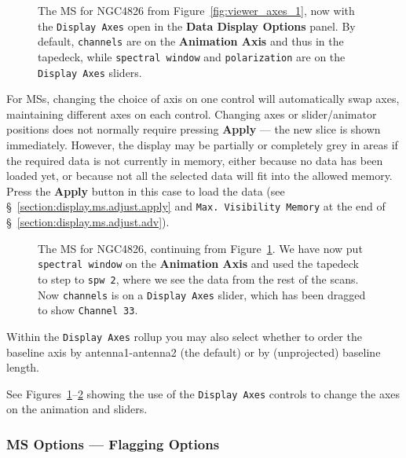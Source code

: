 \begin{figure}[h!]
\begin{center}
\caption{\label{fig:viewer_axes_2} 
The MS for NGC4826 from Figure~\ref{fig:viewer_axes_1}, now with the
{\tt Display Axes} open in the {\bf Data Display Options} panel.  By
default, {\tt channels} are on the {\bf Animation Axis} and thus in
the tapedeck, while {\tt spectral window} and {\tt polarization} are
on the {\tt Display Axes} sliders. } \hrulefill
\end{center}
\end{figure}

For MSs, changing the choice of axis on one control will automatically
swap axes, maintaining different axes on each control.  Changing axes
or slider/animator positions does not normally require pressing
{\bf Apply} --- the new slice is shown immediately.  
However, the display may be 
partially or completely grey in areas if the required data is not
currently in memory, either because no data has been loaded yet, or
because not all the selected data will fit into the allowed memory.
Press the {\bf Apply} button in this case to load the data
(see \S~\ref{section:display.ms.adjust.apply} and 
{\tt Max. Visibility Memory} at the end of 
\S~\ref{section:display.ms.adjust.adv}).

\begin{figure}[h!]
\begin{center}
\caption{\label{fig:viewer_axes_3} The MS for NGC4826,
continuing from Figure~\ref{fig:viewer_axes_2}.  
We have now put {\tt spectral window} on the {\bf Animation Axis} 
and used the tapedeck to step to {\tt spw 2}, where we see the
data from the rest of the scans.  Now {\tt channels} is on a
{\tt Display Axes} slider, which has been dragged to show
{\tt Channel 33}.}
\hrulefill
\end{center}
\end{figure}

Within the {\tt Display Axes} rollup you may also select whether to order
the baseline axis by antenna1-antenna2 (the default) or by (unprojected)
baseline length.

See Figures~\ref{fig:viewer_axes_2}--\ref{fig:viewer_axes_3}
showing the use of the {\tt Display Axes} controls to change the axes on the
animation and sliders.

\subsubsection{MS Options --- Flagging Options}
\label{section:display.ms.adjust.flagging}

